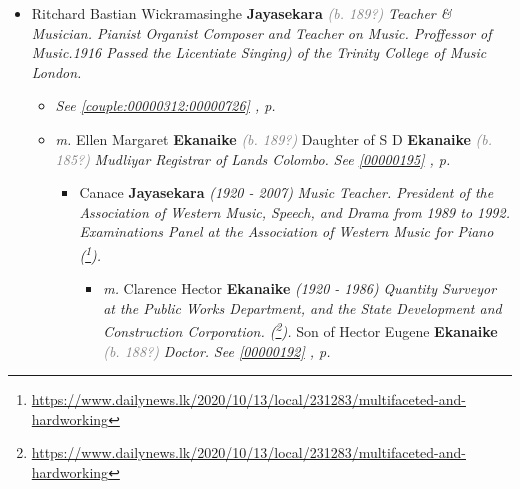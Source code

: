 \documentclass[10pt, openany]{book}
\begin{document}
\begin{itemize}
{\begin{itemize}
{\begin{itemize}
{\begin{itemize}
\item{Douglas V Abraham Suriarachchi \textbf{Amarasekara} \textcolor{slorange}{\textit{(d. 2001)}} \textcolor{slmaroon}{\textit{Retired Proffessor of Mathematics University of Ceylon. Pianist Violinist Artist and Linguist. Excelled in every subject he chose to study. Went to England and got his Mathematics Tripos. Studied Greek and Astronomy. Assisted his father in magic show. After retirement taught music and composed. He continued to help his father in artistic spheres.
Died in 2001 (\footnote{\url{https://www.genlookups.com/sri_lanka/webbbs_config.pl/noframes/read/16}}).}}
    }
\end{itemize}}
\end{itemize}
 }
\item{Ritchard Bastian Wickramasinghe \textbf{Jayasekara} \textcolor{gray}{\textit{(b. 189?)}} \textcolor{slmaroon}{\textit{Teacher \& Musician.
Pianist Organist Composer and Teacher on Music. Proffessor of Music.1916 Passed the Licentiate Singing) of the Trinity College of Music London.}}
\begin{itemize}
\item{\textcolor{slteal}{\textit{See  \autoref{couple:00000312:00000726} \textit{, p. \pageref{couple:00000312:00000726} }}}}
\item{\textit{m.} Ellen Margaret \textbf{Ekanaike} \textcolor{gray}{\textit{(b. 189?)}} Daughter of  S D \textbf{Ekanaike} \textcolor{gray}{\textit{(b. 185?)}} \textcolor{slmaroon}{\textit{Mudliyar Registrar of Lands Colombo.}} \textcolor{slteal}{\textit{See  \autoref{00000195} \textit{, p. \pageref{00000195} }}}   \label{couple:00000191:00000312} \begin{itemize}
\item{Canace \textbf{Jayasekara} \textcolor{slorange}{\textit{(1920 - 2007)}} \textcolor{slmaroon}{\textit{Music Teacher. President of the Association of Western Music, Speech, and Drama from 1989 to 1992. Examinations Panel at the Association of Western Music for Piano (\footnote{\url{https://www.dailynews.lk/2020/10/13/local/231283/multifaceted-and-hardworking}}).}}
\begin{itemize}
\item{\textit{m.} Clarence Hector \textbf{Ekanaike} \textcolor{slorange}{\textit{(1920 - 1986)}} \textcolor{slmaroon}{\textit{Quantity Surveyor at the Public Works Department, and the State Development and Construction Corporation. (\footnote{\url{https://www.dailynews.lk/2020/10/13/local/231283/multifaceted-and-hardworking}}).}} Son of  Hector Eugene \textbf{Ekanaike} \textcolor{gray}{\textit{(b. 188?)}} \textcolor{slmaroon}{\textit{Doctor.}} \textcolor{slteal}{\textit{See  \autoref{00000192} \textit{, p. \pageref{00000192} }}}   \label{couple:00000190:00000286} \begin{itemize}

\end{itemize}}
\end{itemize}}
\end{itemize}}
\end{itemize}}
\end{itemize}}
\end{itemize}
\end{document}
